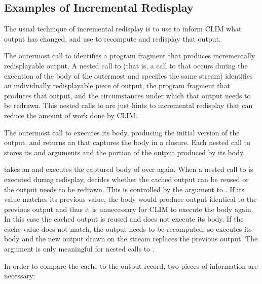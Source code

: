 \subsection {Examples of Incremental Redisplay}

The usual technique of incremental redisplay is to use  to
inform CLIM what output has changed, and use  to recompute and
redisplay that output.

The outermost call to  identifies a program fragment that
produces incrementally redisplayable output.  A nested call to
 (that is, a call to  that occurs during
the execution of the body of the outermost  and specifies
the same stream) identifies an individually redisplayable piece of output, the
program fragment that produces that output, and the circumstances under which
that output needs to be redrawn.  This nested calls to  are
just hints to incremental redisplay that can reduce the amount of work done by
CLIM.

The outermost call to  executes its body, producing the
initial version of the output, and returns an  that
captures the body in a closure.  Each nested call to  stores
its  and  arguments and the portion of the
output produced by its body.

 takes an  and executes the captured
body of  over again.  When a nested call to
 is executed during redisplay,  decides
whether the cached output can be reused or the output needs to be redrawn.  This
is controlled by the  argument to .  If its
value matches its previous value, the body would produce output identical to the
previous output and thus it is unnecessary for CLIM to execute the body again.
In this case the cached output is reused and  does not
execute its body.  If the cache value does not match, the output needs to be
recomputed, so  executes its body and the new output drawn
on the stream replaces the previous output.  The  argument is
only meaningful for nested calls to .

In order to compare the cache to the output record, two pieces of information
are necessary:

